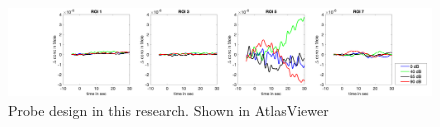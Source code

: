 \begin{figure}[H]
  \centering
    \includegraphics[scale=.3]{bilder/ROI/sub_lin_s_HbO.png}
  \caption{Probe design in this research. Shown in AtlasViewer}
  \label{fig:somesignal}
\end{figure}